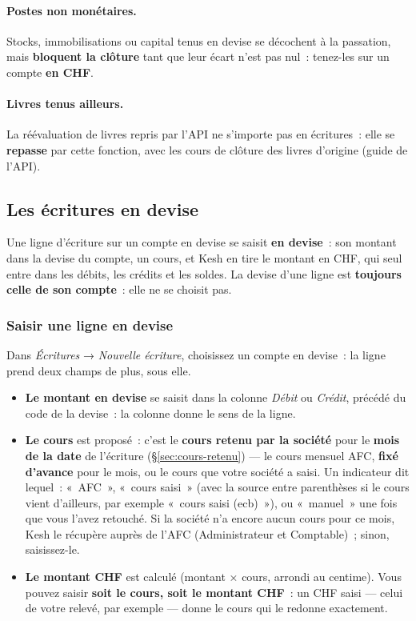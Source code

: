 \documentclass[a4paper,11pt,oneside]{article}
\begin{document}
\paragraph{Postes non monétaires.} Stocks, immobilisations ou capital tenus en devise se décochent à la passation, mais \textbf{bloquent la clôture} tant que leur écart n'est pas nul~: tenez-les sur un compte \textbf{en CHF}.

\paragraph{Livres tenus ailleurs.} La réévaluation de livres repris par l'API ne s'importe pas en écritures~: elle se \textbf{repasse} par cette fonction, avec les cours de clôture des livres d'origine (guide de l'API).

\subsection{Les écritures en devise}\label{sec:ecritures-devise}

Une ligne d'écriture sur un compte en devise se saisit \textbf{en devise}~: son montant dans la devise du compte, un cours, et Kesh en tire le montant en CHF, qui seul entre dans les débits, les crédits et les soldes. La devise d'une ligne est \textbf{toujours celle de son compte}~: elle ne se choisit pas.

\subsubsection{Saisir une ligne en devise}

Dans \emph{Écritures} → \emph{Nouvelle écriture}, choisissez un compte en devise~: la ligne prend deux champs de plus, sous elle.
\begin{itemize}
    \item \textbf{Le montant en devise} se saisit dans la colonne \emph{Débit} ou \emph{Crédit}, précédé du code de la devise~: la colonne donne le sens de la ligne.
    \item \textbf{Le cours} est proposé~: c'est le \textbf{cours retenu par la société} pour le \textbf{mois de la date} de l'écriture (\S\ref{sec:cours-retenu}) --- le cours mensuel AFC, \textbf{fixé d'avance} pour le mois, ou le cours que votre société a saisi. Un indicateur dit lequel~: «~AFC~», «~cours saisi~» (avec la source entre parenthèses si le cours vient d'ailleurs, par exemple «~cours saisi (ecb)~»), ou «~manuel~» une fois que vous l'avez retouché. Si la société n'a encore aucun cours pour ce mois, Kesh le récupère auprès de l'AFC (Administrateur et Comptable)~; sinon, saisissez-le.
    \item \textbf{Le montant CHF} est calculé (montant × cours, arrondi au centime). Vous pouvez saisir \textbf{soit le cours, soit le montant CHF}~: un CHF saisi --- celui de votre relevé, par exemple --- donne le cours qui le redonne exactement.
\end{itemize}
\end{document}
